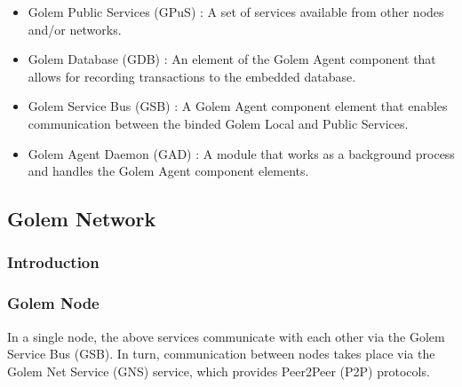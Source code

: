 \begin{itemize}
\item Golem Public Services (GPuS) : A set of services available from other nodes and/or networks.

\item Golem Database (GDB) : An element of the Golem Agent component that allows for recording transactions to the embedded database.

\item Golem Service Bus (GSB) : A Golem Agent component element that enables communication between the binded Golem Local and Public Services.

\item Golem Agent Daemon (GAD) : A module that works as a background process and handles the Golem Agent component elements.

\end{itemize}

\break
\newpage

\subsection{Golem Network}

\subsubsection{Introduction}




\subsubsection{Golem Node}










In a single node, the above services communicate with each other via the Golem Service Bus (GSB).
In turn, communication between nodes takes place via the Golem Net Service (GNS) service, which provides Peer2Peer (P2P) protocols.


